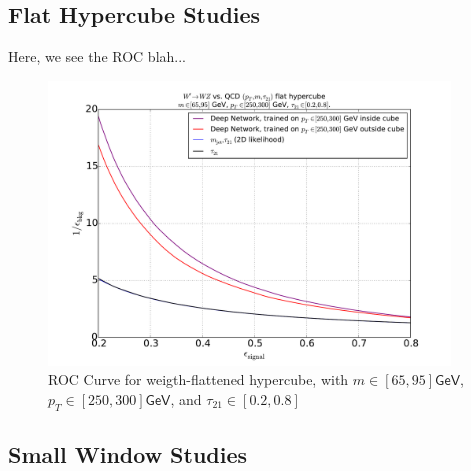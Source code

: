 \documentclass{article}
\begin{document}

\subsection{Flat Hypercube Studies} %
\label{sub:flat_hypercube_studies}


Here, we see the ROC blah...

\begin{figure}[htbp]
  \centering
  \includegraphics[width=0.95\textwidth]{figures/roc-cube-inside.pdf}
  \caption{ROC Curve for weigth-flattened hypercube, with $m\in[65, 95]\mathsf{GeV}$,  $p_T\in[250, 300]\mathsf{GeV}$, and  $\tau_{21}\in[0.2, 0.8]$}
  \label{fig:rocCube}
\end{figure}




\subsection{Small Window Studies} %
\label{sub:small_window_studies}
\end{document}
